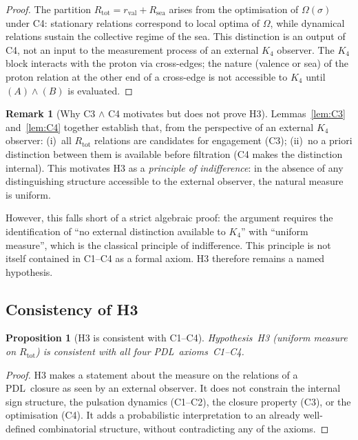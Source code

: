 \documentclass[11pt,a4paper]{article}
\newtheorem{proposition}[theorem]{Proposition}
\theoremstyle{definition}
\newtheorem{remark}[theorem]{Remark}
\newcommand{\PDL}{\textnormal{PDL}}
\newcommand{\Kfour}{K_4}
\newcommand{\rval}{r_{\mathrm{val}}}
\newcommand{\Rsea}{R_{\mathrm{sea}}}
\newcommand{\Rtot}{R_{\mathrm{tot}}}
\begin{document}
\begin{proof}
The partition $\Rtot = \rval + \Rsea$ arises from the optimisation
of $\Omega(\sigma)$ under C4: stationary relations correspond to
local optima of $\Omega$, while dynamical relations sustain the
collective regime of the sea. This distinction is an output of C4,
not an input to the measurement process of an external $\Kfour$
observer. The $\Kfour$ block interacts with the proton via
cross-edges; the nature (valence or sea) of the proton relation
at the other end of a cross-edge is not accessible to $\Kfour$
until $(A)\wedge(B)$ is evaluated.
\end{proof}

\begin{remark}[Why C3 $\wedge$ C4 motivates but does not prove H3]
Lemmas~\ref{lem:C3} and~\ref{lem:C4} together establish that,
from the perspective of an external $\Kfour$ observer:
(i)~all $\Rtot$ relations are candidates for engagement (C3);
(ii)~no a priori distinction between them is available before
filtration (C4 makes the distinction internal).
This motivates H3 as a \emph{principle of indifference}: in the
absence of any distinguishing structure accessible to the external
observer, the natural measure is uniform.

However, this falls short of a strict algebraic proof: the argument
requires the identification of ``no external distinction available
to $\Kfour$'' with ``uniform measure'', which is the classical
principle of indifference. This principle is not itself contained
in C1--C4 as a formal axiom. H3 therefore remains a named hypothesis.
\end{remark}

\subsection{Consistency of H3}

\begin{proposition}[H3 is consistent with C1--C4]
\label{prop:consistent}
Hypothesis~H3 (uniform measure on $\Rtot$) is consistent with all
four \PDL\ axioms~C1--C4.
\end{proposition}

\begin{proof}
H3 makes a statement about the measure on the relations of a
\PDL\ closure as seen by an external observer. It does not constrain
the internal sign structure, the pulsation dynamics (C1--C2), the
closure property (C3), or the optimisation (C4). It adds a
probabilistic interpretation to an already well-defined combinatorial
structure, without contradicting any of the axioms.
\end{proof}
\end{document}
